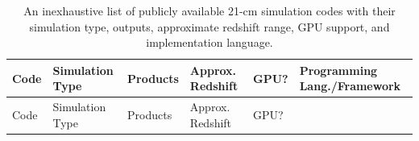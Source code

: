 \documentclass[
]{article}
\begin{document}
\pagebreak
\begin{longtable}[]{@{}
  >{\raggedright\arraybackslash}p{}
  >{\raggedright\arraybackslash}p{}
  >{\raggedright\arraybackslash}p{}
  >{\raggedright\arraybackslash}p{}
  >{\raggedright\arraybackslash}p{}
  >{\raggedright\arraybackslash}p{}@{}}
\caption{An inexhaustive list of publicly available 21-cm simulation
codes with their simulation type, outputs, approximate redshift range,
GPU support, and implementation language.
\label{tab:codes}}\tabularnewline
\toprule\noalign{}
\begin{minipage}[b]{\linewidth}\raggedright
Code
\end{minipage} & \begin{minipage}[b]{\linewidth}\raggedright
Simulation Type
\end{minipage} & \begin{minipage}[b]{\linewidth}\raggedright
Products
\end{minipage} & \begin{minipage}[b]{\linewidth}\raggedright
Approx. Redshift
\end{minipage} & \begin{minipage}[b]{\linewidth}\raggedright
GPU?
\end{minipage} & \begin{minipage}[b]{\linewidth}\raggedright
Programming Lang./Framework
\end{minipage} \\
\midrule\noalign{}
\endfirsthead
\toprule\noalign{}
\begin{minipage}[b]{\linewidth}\raggedright
Code
\end{minipage} & \begin{minipage}[b]{\linewidth}\raggedright
Simulation Type
\end{minipage} & \begin{minipage}[b]{\linewidth}\raggedright
Products
\end{minipage} & \begin{minipage}[b]{\linewidth}\raggedright
Approx. Redshift
\end{minipage} & \begin{minipage}[b]{\linewidth}\raggedright
GPU?
\end{minipage} & \begin{minipage}[b]{\linewidth}\raggedright

\end{minipage}
\end{longtable}
\end{document}
